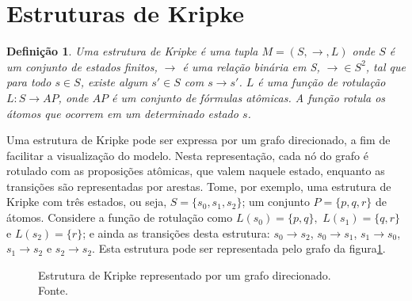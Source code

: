 \documentclass[normaltoc,capchap,capsec,times]{abnt}
\newtheorem{defi}{Definição}[section]
\begin{document}
\section{Estruturas de Kripke}\label{sec:kripke}

\begin{defi}
\textnormal{
Uma estrutura de Kripke é uma tupla $ M = (S, \to , L)$ onde $S$ é um conjunto de estados finitos, $\to$ é uma relação binária em S, $\to \in S^2$, tal que para todo $s \in S$, existe algum $s' \in S$ com $s \to s'$. $L$ é uma função de rotulação $L : S \to AP$, onde $AP$ é um conjunto de fórmulas atômicas. A função rotula os átomos que ocorrem em um determinado estado $s$. 
}
\end{defi}

Uma estrutura de Kripke pode ser expressa por um grafo direcionado, a fim de facilitar a visualização do modelo. Nesta representação, cada nó do grafo é rotulado com as proposições atômicas, que valem naquele estado, enquanto as transições são representadas por arestas. Tome, por exemplo, uma estrutura de Kripke com três estados, ou seja, $S = \{s_0,s_1,s_2\}$; um conjunto $P=\{p,q,r\}$ de átomos. Considere a função de rotulação como $L(s_0)=\{p,q\},$  $L(s_1)=\{q,r\}$ e $L(s_2)=\{r\}$; e ainda as transições desta estrutura: $s_0 \to s_2$, $s_0 \to s_1$, $s_1 \to s_0$, $s_1 \to s_2$ e $s_2 \to s_2$. Esta estrutura pode ser representada pelo grafo da figura\ref{fig:ex_kripke1}.

\begin{figure}[htb]
\begin{center}
\end{center}
\caption[Estrutura de Kripke representado por um grafo direcionado]{Estrutura de Kripke representado por um grafo direcionado. \\ Fonte. }
\label{fig:ex_kripke1}
\end{figure}
\end{document}
